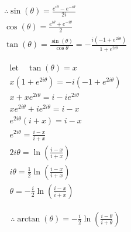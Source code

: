 \documentclass{../style}
\begin{document}
\euler

\begin{gather*}
	\therefore \sin(\theta) = \frac{e^{i\theta} - e^{-i\theta}}{2i} \\
	\cos(\theta) = \frac{e^{i\theta} + e^{-i\theta}}{2} \\
	\tan(\theta) = \frac{\sin(\theta)}{\cos{\theta}} = -\frac{i(-1 + e^{2i\theta})}{1 + e^{2i\theta}}
\end{gather*}

\begin{gather*}
	\text{let} \quad \tan(\theta) = x \\
	x(1 + e^{2i\theta}) = -i(-1 + e^{2i\theta}) \\
	x + xe^{2i\theta} = i - ie^{2i\theta} \\
	xe^{2i\theta} + ie^{2i\theta} = i - x \\
	e^{2i\theta}(i + x) = i - x \\
	e^{2i\theta} = \frac{i - x}{i + x} \\
	2i\theta = \ln(\frac{i - x}{i + x}) \\
	i\theta = \frac{1}{2}\ln(\frac{i - x}{i + x}) \\
	\theta = -\frac{i}{2}\ln(\frac{i - x}{i + x})
\end{gather*}

\begin{gather*}
	\therefore \arctan(\theta) = -\frac{i}{2}\ln(\frac{i - \theta}{i + \theta})
\end{gather*}
\end{document}
